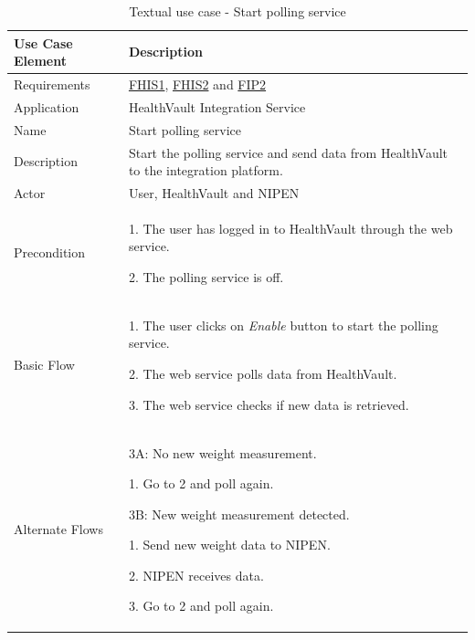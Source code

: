 \begin{table}[H]
\begin{center}
\begin{tabular}{ l | p{10cm} }
  \hline
  \textbf{Use Case Element} & \textbf{Description} \\ \hline\hline
  Requirements & \hyperref[table:reqwebservice]{FHIS1}, \hyperref[table:reqwebservice]{FHIS2} and \hyperref[table:reqip]{FIP2}\\ \hline
  Application & HealthVault Integration Service \\ \hline
  Name & Start polling service \\ \hline
  Description & Start the polling service and send data from HealthVault to the integration platform. \\ \hline
  Actor & User, HealthVault and NIPEN \\ \hline
  Precondition &
    \par 1. The user has logged in to HealthVault through the web service.
    \par 2. The polling service is off.
  \\ \hline
  Basic Flow & 
  	\par 1. The user clicks on \textit{Enable} button to start the polling service.
  	\par 2. The web service polls data from HealthVault.
  	\par 3. The web service checks if new data is retrieved.
  \\ \hline
   Alternate Flows & 
  	\par 3A: No new weight measurement.
  	\par\hspace{15pt} 1. Go to 2 and poll again.
  	\par 3B: New weight measurement detected.
  	\par\hspace{15pt} 1. Send new weight data to NIPEN.
  	\par\hspace{15pt} 2. NIPEN receives data.
  	\par\hspace{15pt} 3. Go to 2 and poll again.
  \\ \hline
\end{tabular}
\end{center}
\caption{Textual use case - Start polling service}
\label{table:use-case-start-polling-service}
\end{table}



